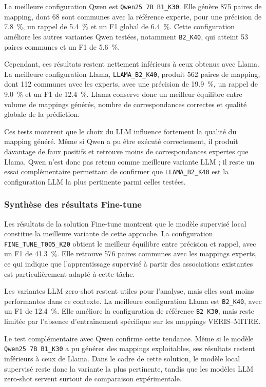 \documentclass[a4paper,12pt]{article}
\begin{document}
La meilleure configuration Qwen est \texttt{Qwen25 7B B1\_K30}. Elle génère 875 paires de mapping, dont 68 sont communes avec la référence experte, pour une précision de 7.8~\%, un rappel de 5.4~\% et un F1 global de 6.4~\%. Cette configuration améliore les autres variantes Qwen testées, notamment \texttt{B2\_K40}, qui atteint 53 paires communes et un F1 de 5.6~\%.

Cependant, ces résultats restent nettement inférieurs à ceux obtenus avec Llama. La meilleure configuration Llama, \texttt{LLAMA\_B2\_K40}, produit 562 paires de mapping, dont 112 communes avec les experts, avec une précision de 19.9~\%, un rappel de 9.0~\% et un F1 de 12.4~\%. Llama conserve donc un meilleur équilibre entre volume de mappings générés, nombre de correspondances correctes et qualité globale de la prédiction.

Ces tests montrent que le choix du LLM influence fortement la qualité du mapping généré. Même si Qwen a pu être exécuté correctement, il produit davantage de faux positifs et retrouve moins de correspondances expertes que Llama. Qwen n'est donc pas retenu comme meilleure variante LLM ; il reste un essai complémentaire permettant de confirmer que \texttt{LLAMA\_B2\_K40} est la configuration LLM la plus pertinente parmi celles testées.

\subsubsection{Synthèse des résultats Fine-tune}

Les résultats de la solution Fine-tune montrent que le modèle supervisé local constitue la meilleure variante de cette approche. La configuration \texttt{FINE\_TUNE\_T005\_K20} obtient le meilleur équilibre entre précision et rappel, avec un F1 de 41.3~\%. Elle retrouve 576 paires communes avec les mappings experts, ce qui indique que l'apprentissage supervisé à partir des associations existantes est particulièrement adapté à cette tâche.

Les variantes LLM zero-shot restent utiles pour l'analyse, mais elles sont moins performantes dans ce contexte. La meilleure configuration Llama est \texttt{B2\_K40}, avec un F1 de 12.4~\%. Elle améliore la configuration de référence \texttt{B2\_K30}, mais reste limitée par l'absence d'entraînement spécifique sur les mappings VERIS--MITRE.

Le test complémentaire avec Qwen confirme cette tendance. Même si le modèle \texttt{Qwen25 7B B1\_K30} a pu générer des mappings exploitables, ses résultats restent inférieurs à ceux de Llama. Dans le cadre de cette solution, le modèle local supervisé reste donc la variante la plus pertinente, tandis que les modèles LLM zero-shot servent surtout de comparaison expérimentale.
\end{document}
